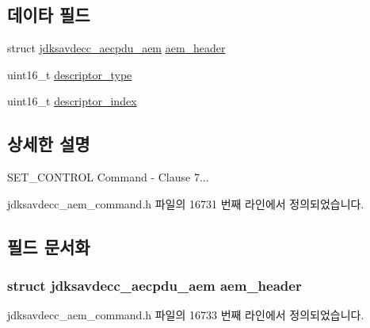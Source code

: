 \subsection*{데이타 필드}
\begin{DoxyCompactItemize}
\item 
struct \hyperlink{structjdksavdecc__aecpdu__aem}{jdksavdecc\+\_\+aecpdu\+\_\+aem} \hyperlink{structjdksavdecc__aem__command__set__control_ae1e77ccb75ff5021ad923221eab38294}{aem\+\_\+header}
\item 
uint16\+\_\+t \hyperlink{structjdksavdecc__aem__command__set__control_ab7c32b6c7131c13d4ea3b7ee2f09b78d}{descriptor\+\_\+type}
\item 
uint16\+\_\+t \hyperlink{structjdksavdecc__aem__command__set__control_a042bbc76d835b82d27c1932431ee38d4}{descriptor\+\_\+index}
\end{DoxyCompactItemize}


\subsection{상세한 설명}
S\+E\+T\+\_\+\+C\+O\+N\+T\+R\+OL Command -\/ Clause 7... 

jdksavdecc\+\_\+aem\+\_\+command.\+h 파일의 16731 번째 라인에서 정의되었습니다.



\subsection{필드 문서화}
\subsubsection[{\texorpdfstring{aem\+\_\+header}{aem_header}}]{\setlength{\rightskip}{0pt plus 5cm}struct {\bf jdksavdecc\+\_\+aecpdu\+\_\+aem} aem\+\_\+header}\hypertarget{structjdksavdecc__aem__command__set__control_ae1e77ccb75ff5021ad923221eab38294}{}\label{structjdksavdecc__aem__command__set__control_ae1e77ccb75ff5021ad923221eab38294}


jdksavdecc\+\_\+aem\+\_\+command.\+h 파일의 16733 번째 라인에서 정의되었습니다.

